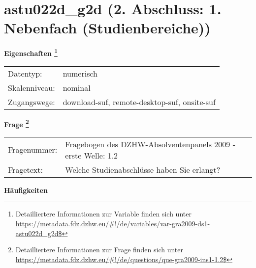 
    \setcounter{footnote}{0}

    \vspace*{-1.8cm}
	\section{astu022d\_g2d (2. Abschluss: 1. Nebenfach (Studienbereiche))}
	\label{section:astu022d_g2d}



    \vspace*{0.5cm}
    \noindent\textbf{Eigenschaften
	\footnote{Detailliertere Informationen zur Variable finden sich unter
		\url{https://metadata.fdz.dzhw.eu/\#!/de/variables/var-gra2009-ds1-astu022d_g2d$}}}\\
	\begin{tabularx}{\hsize}{@{}lX}
	Datentyp: & numerisch \\
	Skalenniveau: & nominal \\
	Zugangswege: &
	  download-suf, 
	  remote-desktop-suf, 
	  onsite-suf
 \\
    \end{tabularx}



				\vspace*{0.5cm}
                \noindent\textbf{Frage
	                \footnote{Detailliertere Informationen zur Frage finden sich unter
		              \url{https://metadata.fdz.dzhw.eu/\#!/de/questions/que-gra2009-ins1-1.2$}}}\\
				\begin{tabularx}{\hsize}{@{}lX}
					Fragenummer: &
					  Fragebogen des DZHW-Absolventenpanels 2009 - erste Welle:
					  1.2
 \\
					Fragetext: & Welche Studienabschlüsse haben Sie erlangt? \\
				\end{tabularx}





        		\vspace*{0.5cm}
                \noindent\textbf{Häufigkeiten}


